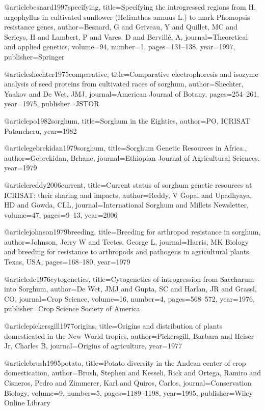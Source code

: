 {@article{besnard1997specifying,
  title={Specifying the introgressed regions from H. argophyllus in cultivated sunflower (Helianthus annuus L.) to mark Phomopsis resistance genes},
  author={Besnard, G and Griveau, Y and Quillet, MC and Serieys, H and Lambert, P and Vares, D and Bervill{\'e}, A},
  journal={Theoretical and applied genetics},
  volume={94},
  number={1},
  pages={131--138},
  year={1997},
  publisher={Springer}
}

@article{shechter1975comparative,
  title={Comparative electrophoresis and isozyme analysis of seed proteins from cultivated races of sorghum},
  author={Shechter, Yaakov and De Wet, JMJ},
  journal={American Journal of Botany},
  pages={254--261},
  year={1975},
  publisher={JSTOR}
}

@article{po1982sorghum,
  title={Sorghum in the Eighties},
  author={PO, ICRISAT Patancheru},
  year={1982}
}

@article{gebrekidan1979sorghum,
  title={Sorghum Genetic Resources in Africa.},
  author={Gebrekidan, Brhane},
  journal={Ethiopian Journal of Agricultural Sciences},
  year={1979}
}

@article{reddy2006current,
  title={Current status of sorghum genetic resources at ICRISAT: their sharing and impacts},
  author={Reddy, V Gopal and Upadhyaya, HD and Gowda, CLL},
  journal={International Sorghum and Millets Newsletter},
  volume={47},
  pages={9--13},
  year={2006}
}

@article{johnson1979breeding,
  title={Breeding for arthropod resistance in sorghum},
  author={Johnson, Jerry W and Teetes, George L},
  journal={Harris, MK Biology and breeding for resistance to arthropods and pathogens in agricultural plants. Texas, USA},
  pages={168--180},
  year={1979}
}

@article{de1976cytogenetics,
  title={Cytogenetics of introgression from Saccharum into Sorghum},
  author={De Wet, JMJ and Gupta, SC and Harlan, JR and Grassl, CO},
  journal={Crop Science},
  volume={16},
  number={4},
  pages={568--572},
  year={1976},
  publisher={Crop Science Society of America}
}

@article{pickersgill1977origins,
  title={Origins and distribution of plants domesticated in the New World tropics},
  author={Pickersgill, Barbara and Heiser Jr, Charles B},
  journal={Origins of agriculture},
  year={1977}
}

@article{brush1995potato,
  title={Potato diversity in the Andean center of crop domestication},
  author={Brush, Stephen and Kesseli, Rick and Ortega, Ramiro and Cisneros, Pedro and Zimmerer, Karl and Quiros, Carlos},
  journal={Conservation Biology},
  volume={9},
  number={5},
  pages={1189--1198},
  year={1995},
  publisher={Wiley Online Library}
}

}
